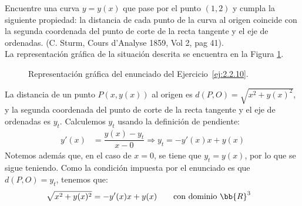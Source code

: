\begin{ejercicio} \label{ej:2.2.10}
    Encuentre una curva $y = y(x)$ que pase por el punto $(1, 2)$ y cumpla la siguiente propiedad: la distancia de cada punto de la curva al origen coincide con la segunda coordenada del punto de corte de la recta tangente y el eje de ordenadas. (C. Sturm, Cours d’Analyse 1859, Vol 2, pag 41).\\

    La representación gráfica de la situación descrita se encuentra en la Figura \ref{fig:ej:2.2.10}.
    \begin{figure}
        \centering
        \caption{Representación gráfica del enunciado del Ejercicio~\ref{ej:2.2.10}.}
        \label{fig:ej:2.2.10}
    \end{figure}

    La distancia de un punto $P(x, y(x))$ al origen es $d(P, O)=\sqrt{x^2+y(x)^2}$, y la segunda coordenada del punto de corte de la recta tangente y el eje de ordenadas es $y_t$. Calculemos $y_t$ usando la definición de pendiente:
    \begin{align*}
        y'(x) &= \dfrac{y(x)-y_t}{x-0} \Longrightarrow y_t = -y'(x)x+y(x)
    \end{align*}
    Notemos además que, en el caso de $x=0$, se tiene que $y_t = y(x)$, por lo que se sigue teniendo. Como la condición impuesta por el enunciado es que $d(P, O)=y_t$, tenemos que:
    \begin{align*}
        \sqrt{x^2+y(x)^2} &= -y'(x)x+y(x) \qquad \text{con dominio }\bb{R}^3
    \end{align*}


\end{ejercicio}
